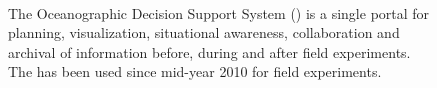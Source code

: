 \begin{figure}
  \centering
  \\
\caption{\small The Oceanographic Decision Support System (\od) is a
  single portal for planning, visualization, situational awareness,
  collaboration and archival of information before, during and after
  field experiments. The \od has been used since mid-year 2010 for
  \can field experiments.}
\label{fig:odss}
\end{figure}

